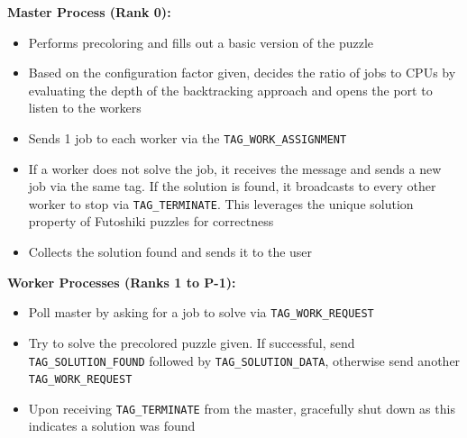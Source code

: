 \begin{enumerate}
\textbf{Master Process (Rank 0):}
\begin{itemize}
    \item Performs precoloring and fills out a basic version of the puzzle
    \item Based on the configuration factor given, decides the ratio of jobs to CPUs by evaluating the depth of the backtracking approach and opens the port to listen to the workers
    \item Sends 1 job to each worker via the \texttt{TAG\_WORK\_ASSIGNMENT}
    \item If a worker does not solve the job, it receives the message and sends a new job via the same tag. If the solution is found, it broadcasts to every other worker to stop via \texttt{TAG\_TERMINATE}. This leverages the unique solution property of Futoshiki puzzles for correctness
    \item Collects the solution found and sends it to the user
\end{itemize}

\textbf{Worker Processes (Ranks 1 to P-1):}
\begin{itemize}
    \item Poll master by asking for a job to solve via \texttt{TAG\_WORK\_REQUEST}
    \item Try to solve the precolored puzzle given. If successful, send \texttt{TAG\_SOLUTION\_FOUND} followed by \texttt{TAG\_SOLUTION\_DATA}, otherwise send another \texttt{TAG\_WORK\_REQUEST}
    \item Upon receiving \texttt{TAG\_TERMINATE} from the master, gracefully shut down as this indicates a solution was found
\end{itemize}


\end{enumerate}
